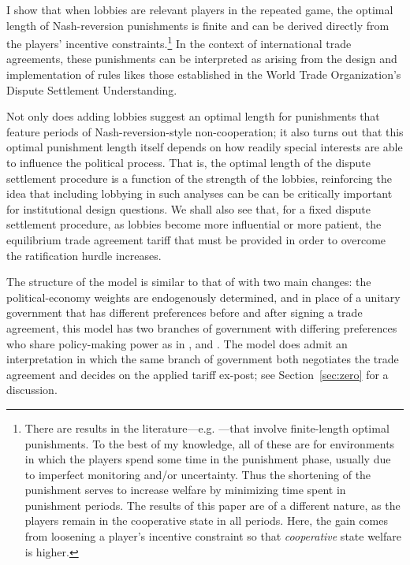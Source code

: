 \documentclass[authoryear, review]{elsarticle}
\begin{document}
I show that when lobbies are relevant players in the repeated game, the optimal length of Nash-reversion punishments is finite and can be derived directly from the players' incentive constraints.\footnote{There are results in the literature---e.g. \citet{greenporter}---that involve finite-length optimal punishments. To the best of my knowledge, all of these are for environments in which the players spend some time in the punishment phase, usually due to imperfect monitoring and/or uncertainty. Thus the shortening of the punishment serves to increase welfare by minimizing time spent in punishment periods. The results of this paper are of a different nature, as the players remain in the cooperative state in all periods. Here, the gain comes from loosening a player's incentive constraint so that \textit{cooperative} state welfare is higher.} In the context of international trade agreements, these punishments can be interpreted as arising from the design and implementation of rules likes those established in the World Trade Organization's Dispute Settlement Understanding.

Not only does adding lobbies suggest an optimal length for punishments that feature periods of Nash-reversion-style non-cooperation; it also turns out that this optimal punishment length itself depends on how readily special interests are able to influence the political process. That is, the optimal length of the dispute settlement procedure is a function of the strength of the lobbies, reinforcing the idea that including lobbying in such analyses can be can be critically important for institutional design questions. We shall also see that, for a fixed dispute settlement procedure, as lobbies become more influential or more patient, the equilibrium trade agreement tariff that must be provided in order to overcome the ratification hurdle increases. 

The structure of the model is similar to that of \citet{bs2005} with two main changes: the political-economy weights are endogenously determined, and in place of a unitary government that has different preferences before and after signing a trade agreement, this model has two branches of government with differing preferences who share policy-making power as in \citet{mr97}, \citet{song} and \citet{buzard2013b}. The model does admit an interpretation in which the same branch of government both negotiates the trade agreement and decides on the applied tariff ex-post; see Section~\ref{sec:zero} for a discussion.
\end{document}
